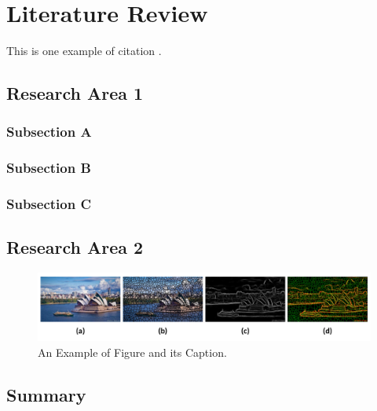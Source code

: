 \chapter{Literature Review}
\label{chap:litertureReview}

This is one example of citation \cite{youtubeStatistic}.

\section{Research Area 1}

\subsection{Subsection A}

\subsection{Subsection B}

\subsection{Subsection C}

\section{Research Area 2}

\begin{figure}[htp]
\centering
\includegraphics[width=1.0\linewidth]{figures/fig_medium_feature.pdf}
\caption{ An Example of Figure and its Caption.
}
\label{fig:campare_of_med_level_feature}
\end{figure}


\section{Summary}

